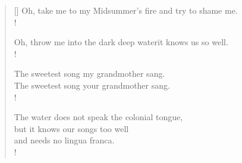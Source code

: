 \begin{verse}[\versewidth]
Oh, take me to my Midsummer's fire and try to shame me.\\!

Oh, throw me into the dark deep water\=it knows us so well.\\!

The sweetest song my grandmother sang.\\
The sweetest song your grandmother sang.\\!

The water does not speak the colonial tongue,\\
but it knows our songs too well\\
and needs no lingua franca.\\!

\end{verse}
